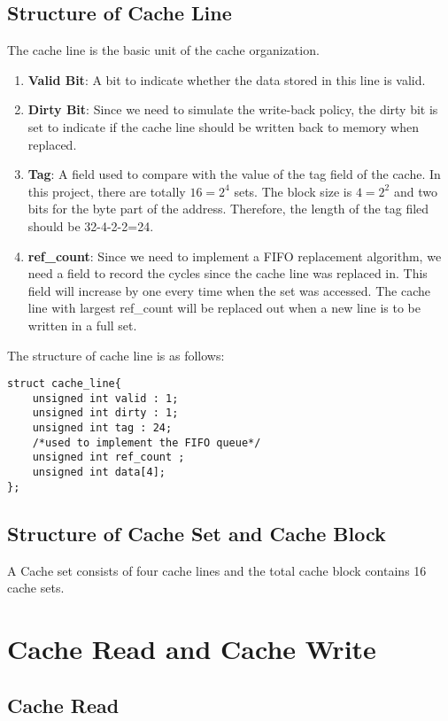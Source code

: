 \documentclass[paper=a4, fontsize=11pt]{scrartcl} %
\numberwithin{equation}{section} %
\numberwithin{figure}{section} %
\numberwithin{table}{section} %
\begin{document}
\subsection{Structure of Cache Line}
The cache line is the basic unit of the cache organization.
\begin{enumerate}
\item \textbf{Valid Bit}: A bit to indicate whether the data stored in this line is valid.
\item \textbf{Dirty Bit}: Since we need to simulate the write-back policy, the dirty bit is set to indicate if the cache line should be written back to memory when replaced.
\item \textbf{Tag}: A field used to compare with the value of the tag field of the cache. In this project, there are totally $16=2^{4}$ sets. The block size is $4=2^{2}$ and two bits for the byte part of the address. Therefore, the length of the tag filed should be 32-4-2-2=24.
\item \textbf{ref\_count}: Since we need to implement a FIFO replacement algorithm, we need a field to record the cycles since the cache line was replaced in. This field will increase by one every time when the set was accessed. The cache line with largest ref\_count will be replaced out when a new line is to be written in a full set.
\end{enumerate}
The structure of cache line is as follows:
\begin{lstlisting}[caption=structure of cache line,label=cache line,style=C]
struct cache_line{
	unsigned int valid : 1;
	unsigned int dirty : 1;
	unsigned int tag : 24;
	/*used to implement the FIFO queue*/
	unsigned int ref_count ;
	unsigned int data[4];
};
\end{lstlisting}

\subsection{Structure of Cache Set and Cache Block}
A Cache set consists of four cache lines and the total cache block contains 16 cache sets. 

\section{Cache Read and Cache Write}



\subsection{Cache Read}
\end{document}

